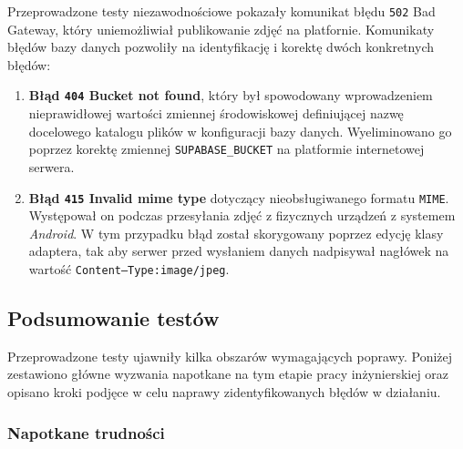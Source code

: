                 Przeprowadzone testy niezawodnościowe pokazały komunikat błędu \texttt{502} Bad Gateway, który uniemożliwiał publikowanie zdjęć na platfornie. Komunikaty błędów bazy danych pozwoliły na identyfikację i korektę dwóch konkretnych błędów:
                \begin{enumerate}
                    \item \textbf{Błąd \texttt{404} Bucket not found}, który był spowodowany wprowadzeniem nieprawidłowej wartości zmiennej środowiskowej definiującej nazwę docelowego katalogu plików w konfiguracji bazy danych. Wyeliminowano go poprzez korektę zmiennej \texttt{SUPABASE\_BUCKET} na platformie internetowej serwera.
                    \item \textbf{Błąd \texttt{415} Invalid mime type} dotyczący nieobsługiwanego formatu \texttt{MIME}. Występował on podczas przesyłania zdjęć z fizycznych urządzeń z systemem \textit{Android}. W tym przypadku błąd został skorygowany poprzez edycję klasy adaptera, tak aby serwer przed wysłaniem danych nadpisywał nagłówek na wartość \texttt{Content–Type:image/jpeg}.
                \end{enumerate}

        \subsection{Podsumowanie testów}

            Przeprowadzone testy ujawniły kilka obszarów wymagających poprawy. Poniżej zestawiono główne wyzwania napotkane na tym etapie pracy inżynierskiej oraz opisano kroki podjęce w celu naprawy zidentyfikowanych błędów w działaniu.
            
            \subsubsection{Napotkane trudności}

